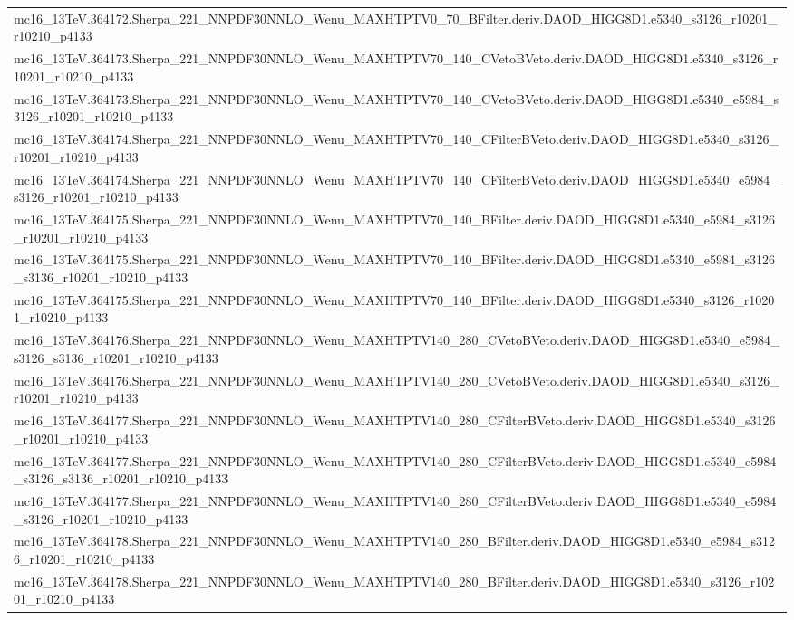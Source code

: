 \begin{adjustwidth}{-3em}{-3em}
\begin{longtable}{l}
mc16\_13TeV.364172.Sherpa\_221\_NNPDF30NNLO\_Wenu\_MAXHTPTV0\_70\_BFilter.deriv.DAOD\_HIGG8D1.e5340\_s3126\_r10201\_r10210\_p4133 \\
mc16\_13TeV.364173.Sherpa\_221\_NNPDF30NNLO\_Wenu\_MAXHTPTV70\_140\_CVetoBVeto.deriv.DAOD\_HIGG8D1.e5340\_s3126\_r10201\_r10210\_p4133 \\
mc16\_13TeV.364173.Sherpa\_221\_NNPDF30NNLO\_Wenu\_MAXHTPTV70\_140\_CVetoBVeto.deriv.DAOD\_HIGG8D1.e5340\_e5984\_s3126\_r10201\_r10210\_p4133 \\
mc16\_13TeV.364174.Sherpa\_221\_NNPDF30NNLO\_Wenu\_MAXHTPTV70\_140\_CFilterBVeto.deriv.DAOD\_HIGG8D1.e5340\_s3126\_r10201\_r10210\_p4133 \\
mc16\_13TeV.364174.Sherpa\_221\_NNPDF30NNLO\_Wenu\_MAXHTPTV70\_140\_CFilterBVeto.deriv.DAOD\_HIGG8D1.e5340\_e5984\_s3126\_r10201\_r10210\_p4133 \\
mc16\_13TeV.364175.Sherpa\_221\_NNPDF30NNLO\_Wenu\_MAXHTPTV70\_140\_BFilter.deriv.DAOD\_HIGG8D1.e5340\_e5984\_s3126\_r10201\_r10210\_p4133 \\
mc16\_13TeV.364175.Sherpa\_221\_NNPDF30NNLO\_Wenu\_MAXHTPTV70\_140\_BFilter.deriv.DAOD\_HIGG8D1.e5340\_e5984\_s3126\_s3136\_r10201\_r10210\_p4133 \\
mc16\_13TeV.364175.Sherpa\_221\_NNPDF30NNLO\_Wenu\_MAXHTPTV70\_140\_BFilter.deriv.DAOD\_HIGG8D1.e5340\_s3126\_r10201\_r10210\_p4133 \\
mc16\_13TeV.364176.Sherpa\_221\_NNPDF30NNLO\_Wenu\_MAXHTPTV140\_280\_CVetoBVeto.deriv.DAOD\_HIGG8D1.e5340\_e5984\_s3126\_s3136\_r10201\_r10210\_p4133 \\
mc16\_13TeV.364176.Sherpa\_221\_NNPDF30NNLO\_Wenu\_MAXHTPTV140\_280\_CVetoBVeto.deriv.DAOD\_HIGG8D1.e5340\_s3126\_r10201\_r10210\_p4133 \\
mc16\_13TeV.364177.Sherpa\_221\_NNPDF30NNLO\_Wenu\_MAXHTPTV140\_280\_CFilterBVeto.deriv.DAOD\_HIGG8D1.e5340\_s3126\_r10201\_r10210\_p4133 \\
mc16\_13TeV.364177.Sherpa\_221\_NNPDF30NNLO\_Wenu\_MAXHTPTV140\_280\_CFilterBVeto.deriv.DAOD\_HIGG8D1.e5340\_e5984\_s3126\_s3136\_r10201\_r10210\_p4133 \\
mc16\_13TeV.364177.Sherpa\_221\_NNPDF30NNLO\_Wenu\_MAXHTPTV140\_280\_CFilterBVeto.deriv.DAOD\_HIGG8D1.e5340\_e5984\_s3126\_r10201\_r10210\_p4133 \\
mc16\_13TeV.364178.Sherpa\_221\_NNPDF30NNLO\_Wenu\_MAXHTPTV140\_280\_BFilter.deriv.DAOD\_HIGG8D1.e5340\_e5984\_s3126\_r10201\_r10210\_p4133 \\
mc16\_13TeV.364178.Sherpa\_221\_NNPDF30NNLO\_Wenu\_MAXHTPTV140\_280\_BFilter.deriv.DAOD\_HIGG8D1.e5340\_s3126\_r10201\_r10210\_p4133 \\

\end{longtable}
\end{adjustwidth}
